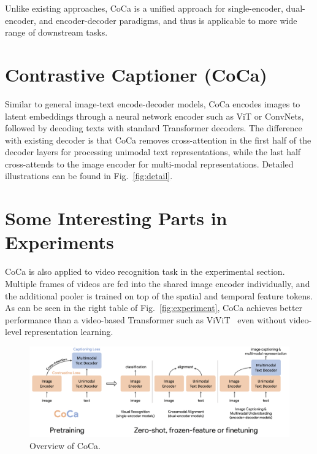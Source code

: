 \documentclass[10pt,twocolumn,letterpaper]{article}
\begin{document}
Unlike existing approaches, CoCa is a unified approach for single-encoder, dual-encoder, and encoder-decoder paradigms, and thus is applicable to more wide range of downstream tasks.



\section{Contrastive Captioner (CoCa)}

Similar to general image-text encode-decoder models, CoCa encodes images to latent embeddings through a neural network encoder such as ViT or ConvNets, followed by decoding texts with standard Transformer decoders.
The difference with existing decoder is that CoCa removes cross-attention in the first half of the decoder layers for processing unimodal text representations, while the last half cross-attends to the image encoder for multi-modal representations.
Detailed illustrations can be found in Fig.~\ref{fig:detail}.






\section{Some Interesting Parts in Experiments}

CoCa is also applied to video recognition task in the experimental section.
Multiple frames of videos are fed into the shared image encoder individually, and the additional pooler is trained on top of the spatial and temporal feature tokens.
As can be seen in the right table of Fig.~\ref{fig:experiment},
CoCa achieves better performance than a video-based Transformer such as ViViT~\cite{vivit} even without video-level representation learning.


\begin{figure}[t]
    \includegraphics[width=\linewidth]{assets/coca_overview.png}
    \caption{\label{fig:overview}Overview of CoCa.}
\end{figure}
\end{document}
